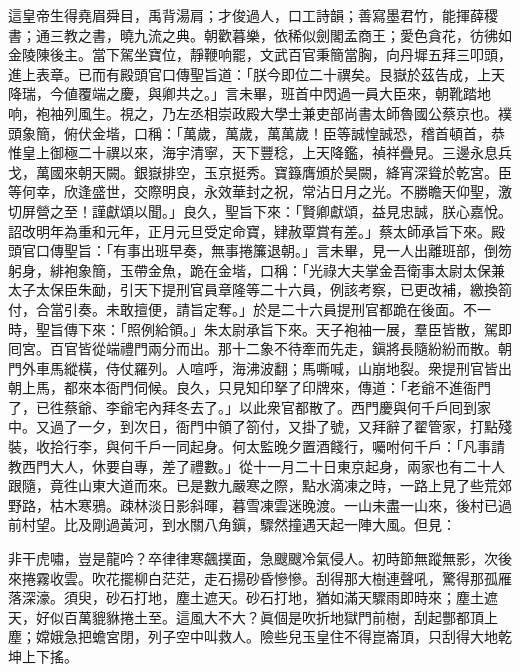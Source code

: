 這皇帝生得堯眉舜目，禹背湯肩；才俊過人，口工詩韻；善寫墨君竹，能揮薛稷書；通三教之書，曉九流之典。朝歡暮樂，依稀似劍閣孟商王；愛色貪花，彷彿如金陵陳後主。{}當下駕坐寶位，靜鞭响罷，文武百官秉簡當胸，向丹墀五拜三叩頭，進上表章。已而有殿頭官口傳聖旨道：「朕今即位二十禩矣。艮嶽於茲告成，上天降瑞，今値覆端之慶，與卿共之。」言未畢，班首中閃過一員大臣來，朝靴踏地响，袍袖列風生。視之，乃左丞相崇政殿大學士兼吏部尚書太師魯國公蔡京也。襆頭象簡，俯伏金堦，口稱：「萬歲，萬歲，萬萬歲！臣等誠惶誠恐，稽首頓首，恭惟皇上御極二十禩以來，海宇清寧，天下豐稔，上天降鑑，禎祥疊見。三邊永息兵戈，萬國來朝天闕。銀嶽排空，玉京挺秀。寶籙膺頒於昊闕，絳宵深聳於乾宮。{}臣等何幸，欣逢盛世，交際明良，永效華封之祝，常沾日月之光。不勝瞻天仰聖，激切屏營之至！謹獻頌以聞。」{}良久，聖旨下來：「賢卿獻頌，益見忠誠，朕心嘉悅。詔改明年為重和元年，正月元旦受定命寶，肄赦覃賞有差。」蔡太師承旨下來。殿頭官口傳聖旨：「有事出班早奏，無事捲簾退朝。」言未畢，見一人出離班部，倒笏躬身，緋袍象簡，玉帶金魚，跪在金堦，口稱：「光祿大夫掌金吾衛事太尉太保兼太子太保臣朱勔，引天下提刑官員章隆等二十六員，例該考察，已更改補，繳換箚付，合當引奏。未敢擅便，請旨定奪。」於是二十六員提刑官都跪在後面。不一時，聖旨傳下來：「照例給領。」朱太尉承旨下來。天子袍袖一展，羣臣皆散，駕即囘宮。百官皆從端禮門兩分而出。那十二象不待牽而先走，鎭將長隨紛紛而散。朝門外車馬縱橫，侍仗羅列。人喧呼，海沸波翻；馬嘶喊，山崩地裂。衆提刑官皆出朝上馬，都來本衙門伺候。良久，只見知印拏了印牌來，傳道：「老爺不進衙門了，已徃蔡爺、李爺宅內拜冬去了。」以此衆官都散了。西門慶與何千戶囘到家中。又過了一夕，到次日，衙門中領了箚付，又掛了號，又拜辭了翟管家，打點殘裝，收拾行李，與何千戶一同起身。何太監晚夕置酒餞行，囑咐何千戶：「凡事請教西門大人，休要自專，差了禮數。」從十一月二十日東京起身，兩家也有二十人跟隨，竟徃山東大道而來。已是數九嚴寒之際，點水滴凍之時，一路上見了些荒郊野路，枯木寒鴉。疎林淡日影斜暉，暮雪凍雲迷晚渡。一山未盡一山來，後村已過前村望。比及剛過黃河，到水關八角鎭，驟然撞遇天起一陣大風。{}但見：

\begin{myquote}
非干虎嘯，豈是龍吟？卒律律寒飆撲面，急颼颼冷氣侵人。初時節無蹤無影，次後來捲霧收雲。吹花擺柳白茫茫，走石揚砂昏慘慘。刮得那大樹連聲吼，驚得那孤雁落深濠。須臾，砂石打地，塵土遮天。砂石打地，猶如滿天驟雨即時來；塵土遮天，好似百萬貔貅捲土至。這風大不大？眞個是吹折地獄門前樹，刮起酆都頂上塵；嫦娥急把蟾宮閉，列子空中叫救人。險些兒玉皇住不得崑崙頂，只刮得大地乾坤上下搖。
\end{myquote}

